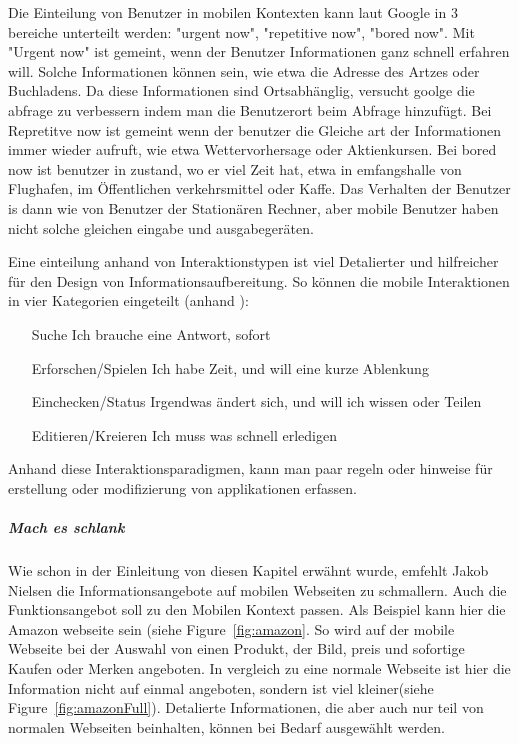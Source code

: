 Die Einteilung von Benutzer in mobilen Kontexten kann laut Google in 3 bereiche unterteilt werden: "urgent now", "repetitive now", "bored now"\cite{googleUsers}. Mit "Urgent now" ist gemeint, wenn der Benutzer Informationen ganz schnell erfahren will. Solche Informationen können sein, wie etwa die Adresse des Artzes oder Buchladens. Da diese Informationen sind Ortsabhänglig, versucht goolge die abfrage zu verbessern indem man die Benutzerort beim Abfrage hinzufügt. Bei Repretitve now ist gemeint wenn der benutzer die Gleiche art der Informationen immer wieder aufruft, wie etwa Wettervorhersage oder Aktienkursen. Bei bored now ist benutzer in zustand, wo er viel Zeit hat, etwa in emfangshalle von Flughafen, im Öffentlichen verkehrsmittel  oder Kaffe. Das Verhalten der Benutzer is dann wie von Benutzer der Stationären Rechner, aber mobile Benutzer haben nicht solche gleichen eingabe und ausgabegeräten.

Eine einteilung anhand von Interaktionstypen ist viel Detalierter und hilfreicher für den Design von Informationsaufbereitung. So können die mobile Interaktionen in vier Kategorien eingeteilt (anhand \cite[Seite 50]{mobileFirst}):

\begin{itemize}
 	\item[Suche] Ich brauche eine Antwort, sofort
 	\item[Erforschen/Spielen] Ich habe Zeit, und will eine kurze Ablenkung
 	\item[Einchecken/Status] Irgendwas ändert sich, und will ich wissen oder Teilen
 	\item[Editieren/Kreieren] Ich muss was schnell erledigen
 \end{itemize} 

Anhand diese Interaktionsparadigmen, kann man paar regeln oder hinweise für erstellung oder modifizierung von applikationen erfassen.

\subparagraph{Mach es schlank} 
\label{subp:entferne_das_fett}

Wie schon in der Einleitung von diesen Kapitel erwähnt wurde, emfehlt Jakob Nielsen die Informationsangebote auf mobilen Webseiten zu schmallern. Auch die Funktionsangebot soll zu den Mobilen Kontext passen. Als Beispiel kann hier die Amazon webseite sein (siehe Figure~\ref{fig:amazon}. So wird auf der mobile Webseite bei der Auswahl von einen Produkt, der Bild, preis und sofortige Kaufen oder Merken angeboten. In vergleich zu eine normale Webseite ist hier die Information nicht auf einmal angeboten, sondern ist viel kleiner(siehe Figure~\ref{fig:amazonFull}). Detalierte Informationen, die aber auch nur teil von normalen Webseiten beinhalten, können bei Bedarf ausgewählt werden. 

